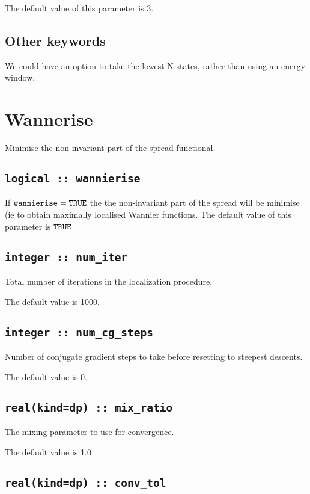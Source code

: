 The default value of this parameter is 3.


\subsection{Other keywords}
 We could have an option to take the lowest N states, rather than using
 an energy window.



\section{Wannerise}
Minimise the non-invariant part of the spread functional.

\subsection[wannierise]{\tt logical :: wannierise}
If $\verb#wannierise#=\verb#TRUE#$ the the non-invariant part of the
spread will be minimise (ie to obtain maximally localised Wannier functions.
The default value of this parameter is $\verb#TRUE#$


\subsection[num\_iter]{\tt integer :: num\_iter}

Total number of iterations in the localization procedure.

The default value is 1000.

\subsection[num\_cg\_steps]{\tt integer :: num\_cg\_steps}

Number of conjugate gradient steps to take before resetting to steepest descents.

The default value is 0.



\subsection[mix\_ratio]{\tt real(kind=dp) :: mix\_ratio}
The mixing parameter to use for convergence.

The default value is 1.0

\subsection[conv\_tol]{\tt real(kind=dp) :: conv\_tol}

